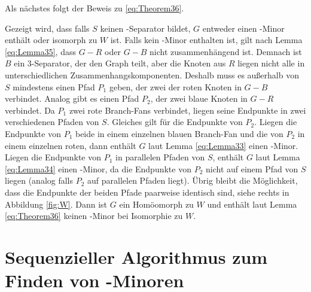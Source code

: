 Als nächstes folgt der Beweis zu \ref{eq:Theorem36}.
\begin{beweis}
  Gezeigt wird, dass falls $S$ keinen \dd-Separator bildet, $G$ entweder einen \kf-Minor enthält oder isomorph zu $W$ ist.
  Falls kein \kf-Minor enthalten ist, gilt nach Lemma \ref{eq:Lemma35}, dass $G - R$ oder $G - B$ nicht zusammenhängend ist.
  Demnach ist $B$ ein $3$-Separator, der den Graph teilt, aber die Knoten aus $R$ liegen nicht alle in unterschiedlichen Zusammenhangskomponenten.
  Deshalb muss es außerhalb von $S$ mindestens einen Pfad $P_1$ geben, der zwei der roten Knoten in $G - B$ verbindet.
  Analog gibt es einen Pfad $P_2$, der zwei blaue Knoten in $G - R$ verbindet.
  Da $P_1$ zwei rote Branch-Fans verbindet, liegen seine Endpunkte in zwei verschiedenen Pfaden von $S$.
  Gleiches gilt für die Endpunkte von $P_2$.
  Liegen die Endpunkte von $P_1$ beide in einem einzelnen blauen Branch-Fan und die von $P_2$ in einem einzelnen roten, dann enthält $G$ laut Lemma \ref{eq:Lemma33} einen \kf-Minor.
  Liegen die Endpunkte von $P_1$ in parallelen Pfaden von $S$, enthält $G$ laut Lemma \ref{eq:Lemma34} einen \kf-Minor, da die Endpunkte von $P_2$ nicht auf einem Pfad von $S$ liegen (analog falls $P_2$ auf parallelen Pfaden liegt).
  Übrig bleibt die Möglichkeit, dass die Endpunkte der beiden Pfade paarweise identisch sind, siehe rechts in Abbildung \ref{fig:W}.
  Dann ist $G$ ein Homöomorph zu $W$ und enthält laut Lemma \ref{eq:Theorem36} keinen \kf-Minor bei Isomorphie zu $W$.
\end{beweis}


\section{Sequenzieller Algorithmus zum Finden von \kf-Minoren}
\label{sec:sequenzieller_algorithmus_zum_finden_von_kf_minoren}

